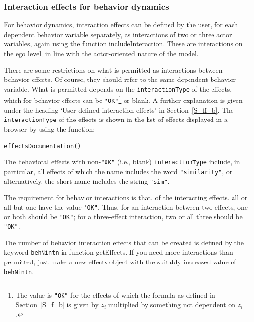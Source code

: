 \documentclass[a4paper,fleqn,11pt]{article}
\newcommand{\+}{\, + \,}
\newcommand{\sfn}[1]{\textsf{#1}}
\begin{document}
\subsubsection{Interaction effects for behavior dynamics}
\label{S_beh_infl}

For behavior dynamics, interaction effects can be defined
by the user, for each dependent behavior variable separately,
as interactions of two or three actor variables,
again using the function \textsf{includeInteraction}.
These are interactions on the ego level, in line with the
actor-oriented nature of the model.

There are some restrictions on what is permitted
as interactions between behavior effects.
Of course,  they should refer to the same dependent behavior variable.
What is permitted depends on the \texttt{interactionType} of the
effects, which for behavior effects can be \texttt{"OK"}\footnote{The value
is \texttt{"OK"} for the effects of which the
formula as defined in Section~\ref{S_f_b}
is given by $z_i$ multiplied by something not dependent on $z_i$.}
or blank.
A further explanation is given under the heading `User-defined interaction effects'
in Section~\ref{S_ff_b}.
The \texttt{interactionType} of the effects
is shown in the list of effects displayed in a browser by using the function:

\verb|effectsDocumentation()|
\bigskip

The behavioral effects with non-\texttt{"OK"} (i.e., blank)
\texttt{interactionType} include,
in particular, all effects of which the name
includes the word \texttt{"similarity"},
or alternatively, the short name includes the string \texttt{"sim"}.

The requirement for behavior interactions is that,
of the interacting effects, all or all but one have
the value \texttt{"OK"}. Thus, for an interaction between two effects,
one or both should be \texttt{"OK"}; for a three-effect interaction,
two or all three should be \texttt{"OK"}.

The number of behavior interaction effects that can be created is defined by the
keyword \texttt{behNintn} in function \sfn{getEffects}. If you need more
interactions than permitted, just make a new effects object with the
suitably increased value of \texttt{behNintn}.
\end{document}
